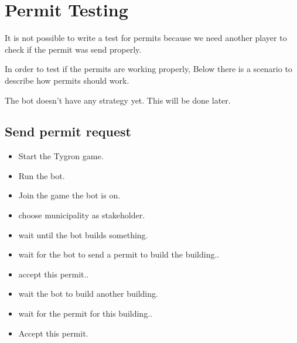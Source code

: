 \documentclass[]{article}
\begin{document}
	
\section{Permit Testing}
It is not possible to write a test for permits because we need another player to check if the permit was send properly.

In order to test if the permits are working properly, Below there  is a scenario to describe how permits should work.

The bot doesn't have any strategy yet. This will be done later.

\subsection{Send permit request}
\begin{itemize}
	\item Start the Tygron game.
	\item Run the bot.
	\item Join the game the bot is on.
	\item choose municipality as stakeholder.
	\item wait until the bot builds something.
	\item wait for the bot to send a permit to build the building..
	\item accept this permit..
	\item wait the bot to build another building.
	\item wait for the permit for this building..
	\item Accept this permit.
\end{itemize}
\end{document}
